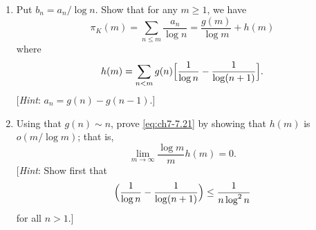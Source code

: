 \begin{exercise}[23]
\begin{enumerate}[label=(\alph*)]
      \[
        g(x) = \sum_{N(P) \le x} \log N(P) \sim x.
      \]
    \item Put $b_n = a_n/\log n$. Show that for any $m \ge 1$, we have
      \[
        \pi_K(m) = \sum_{n \le m} \frac{a_n}{\log n}
        = \frac{g(m)}{\log m} + h(m)
      \]
      where
      \[
        h(m) = \sum_{n < m} g(n)
        \Bigl[\frac{1}{\log n} - \frac{1}{\log(n+1)}\Bigr].
      \]
      [\emph{Hint}: $a_n = g(n) - g(n-1)$.]
    \item Using that $g(n) \sim n$, prove \eqref{eq:ch7-7.21} by showing that
      $h(m)$ is $o(m/\log m)$; that is,
      \[
        \lim_{m \to \infty} \frac{\log m}{m} h(m) = 0.
      \]
      [\emph{Hint}: Show first that
      \[
        \Bigl(\frac{1}{\log n} - \frac{1}{\log(n+1)}\Bigr)
        \le \frac{1}{n\log^2 n}
      \]
      for all $n > 1$.]
  \end{enumerate}
\end{exercise}
